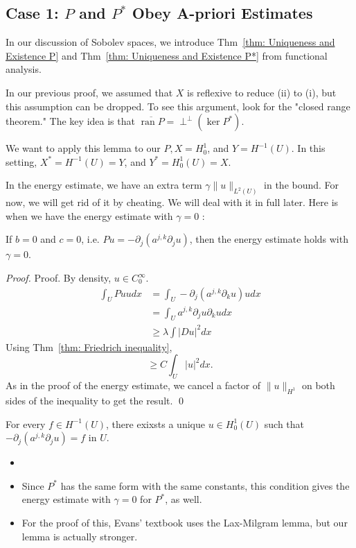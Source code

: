 \subsection{Case 1: $P$ and $P^*$ Obey A-priori Estimates}
In our discussion of Sobolev spaces, we introduce Thm~\ref{thm: Uniqueness and Existence P} and Thm~\ref{thm: Uniqueness and Existence P*} from functional analysis. 

In our previous proof, we assumed that $X$ is reflexive to reduce (ii) to (i), but this assumption can be dropped. To see this argument, look for the "closed range theorem." The key idea is that $\overline{\operatorname{ran} P}=\perp^{\perp}\left(\operatorname{ker} P^{*}\right)$.

We want to apply this lemma to our $P, X=H_{0}^{1}$, and $Y=H^{-1}(U)$. In this setting, $X^{*}=H^{-1}(U)=Y$, and $Y^{*}=H_{0}^{1}(U)=X$.

In the energy estimate, we have an extra term $\gamma\|u\|_{L^{2}(U)}$ in the bound. For now, we will get rid of it by cheating. We will deal with it in full later. Here is when we have the energy estimate with $\gamma=0$ :

\begin{lemma}
\label{lem: Energy estimate gamma=0}
If $b=0$ and $c=0$, i.e. $P u=-\partial_{j}\left(a^{j, k} \partial_{j} u\right)$, then the energy estimate holds with $\gamma=0$.
\end{lemma}
\begin{proof}
    Proof. By density, $u \in C_{0}^{\infty}$.
    $$
    \begin{aligned}
    \int_{U} P u u d x &=\int_{U}-\partial_{j}\left(a^{j, k} \partial_{k} u\right) u d x \\
    &=\int_{U} a^{j, k} \partial_{j} u \partial_{k} u d x \\
    &\geq \lambda \int|D u|^{2} d x
    \end{aligned}
    $$
    Using Thm~\ref{thm: Friedrich inequality},
    $$
    \geq C \int_{U}|u|^{2} d x .
    $$
    As in the proof of the energy estimate, we cancel a factor of $\|u\|_{H^{1}}$ on both sides of the inequality to get the result.
    \qed 
\end{proof}
\begin{theorem}
\label{thm: Well-posedness gamma=0}
For every $f \in H^{-1}(U)$, there exixsts a unique $u \in H_{0}^{1}(U)$ such that $-\partial_{j}\left(a^{j, k} \partial_{j} u\right)=f$ in $U$.
\end{theorem}
\begin{remark}
\begin{itemize}
    \item []
    \item Since $P^{*}$ has the same form with the same constants, this condition gives the energy estimate with $\gamma=0$ for $P^{*}$, as well.
    \item For the proof of this, Evans' textbook uses the Lax-Milgram lemma, but our lemma is actually stronger.
\end{itemize}
\end{remark}

